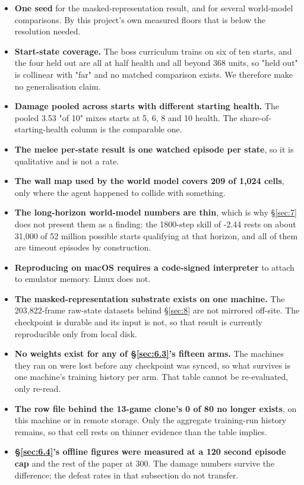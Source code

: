 \documentclass[11pt]{article}
\begin{document}
\begin{itemize}
\item \textbf{One seed} for the masked-representation result, and for several world-model comparisons. By this project's own measured floors that is below the resolution needed.
\item \textbf{Start-state coverage.} The boss curriculum trains on six of ten starts, and the four held out are all at half health and all beyond 368 units, so "held out" is collinear with "far" and no matched comparison exists. We therefore make no generalisation claim.
\item \textbf{Damage pooled across starts with different starting health.} The pooled 3.53 "of 10" mixes starts at 5, 6, 8 and 10 health. The share-of-starting-health column is the comparable one.
\item \textbf{The melee per-state result is one watched episode per state}, so it is qualitative and is not a rate.
\item \textbf{The wall map used by the world model covers 209 of 1,024 cells}, only where the agent happened to collide with something.
\item \textbf{The long-horizon world-model numbers are thin}, which is why \S\ref{sec:7} does not present them as a finding: the 1800-step skill of -2.44 rests on about 31,000 of 52 million possible starts qualifying at that horizon, and all of them are timeout episodes by construction.
\item \textbf{Reproducing on macOS requires a code-signed interpreter} to attach to emulator memory. Linux does not.
\item \textbf{The masked-representation substrate exists on one machine.} The 203,822-frame raw-state datasets behind \S\ref{sec:8} are not mirrored off-site. The checkpoint is durable and its input is not, so that result is currently reproducible only from local disk.
\item \textbf{No weights exist for any of \S\ref{sec:6.3}'s fifteen arms.} The machines they ran on were lost before any checkpoint was synced, so what survives is one machine's training history per arm. That table cannot be re-evaluated, only re-read.
\item \textbf{The row file behind the 13-game clone's 0 of 80 no longer exists}, on this machine or in remote storage. Only the aggregate training-run history remains, so that cell rests on thinner evidence than the table implies.
\item \textbf{\S\ref{sec:6.4}'s offline figures were measured at a 120 second episode cap} and the rest of the paper at 300. The damage numbers survive the difference; the defeat rates in that subsection do not transfer.

\end{itemize}
\end{document}
